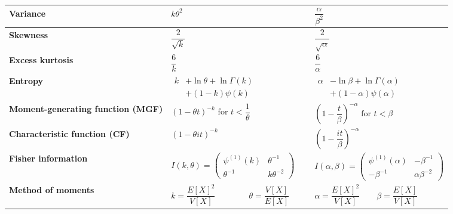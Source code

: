 \begin{longtable}{|m{3cm}|p{5.5cm}|p{5.5cm}|}
    \textbf{Variance} &
    ${\displaystyle k\theta ^{2}}$ &
    ${\displaystyle {\dfrac {\alpha }{\beta ^{2}}}}$
    \\[1ex] \hline

    \textbf{Skewness} &
    ${\displaystyle {\dfrac {2}{\sqrt {k}}}}$&
    ${\displaystyle {\dfrac {2}{\sqrt {\alpha }}}}$
    \\[1ex] \hline

    \textbf{Excess kurtosis} &
    ${\displaystyle {\dfrac {6}{k}}}$&
    ${\displaystyle {\dfrac {6}{\alpha }}}$
    \\[1ex] \hline

    \textbf{Entropy} &
    ${\displaystyle {\begin{aligned}k&+\ln \theta +\ln \Gamma (k)\\&+(1-k)\psi (k)\end{aligned}}}$&
    ${\displaystyle {\begin{aligned}\alpha &-\ln \beta +\ln \Gamma (\alpha )\\&+(1-\alpha )\psi (\alpha )\end{aligned}}}$
    \\[1ex] \hline

    \textbf{Moment-generating function (MGF)} &
    ${\displaystyle (1-\theta t)^{-k}{\text{ for }}t<{\dfrac {1}{\theta }}}$&
    ${\displaystyle \left(1-{\dfrac {t}{\beta }}\right)^{-\alpha }{\text{ for }}t<\beta }$
    \\[1ex] \hline

    \textbf{Characteristic function (CF)} &
    ${\displaystyle (1-\theta it)^{-k}}$&
    ${\displaystyle \left(1-{\dfrac {it}{\beta }}\right)^{-\alpha }}$
    \\[1ex] \hline

    \textbf{Fisher information} &
    ${\displaystyle I(k,\theta )={\begin{pmatrix}\psi ^{(1)}(k)&\theta ^{-1}\\\theta ^{-1}&k\theta ^{-2}\end{pmatrix}}}$&
    ${\displaystyle I(\alpha ,\beta )={\begin{pmatrix}\psi ^{(1)}(\alpha )&-\beta ^{-1}\\-\beta ^{-1}&\alpha \beta ^{-2}\end{pmatrix}}}$
    \\[1ex] \hline

    \textbf{Method of moments} &
    $
        {\displaystyle k={\dfrac {E[X]^{2}}{V[X]}}\quad \quad }
        \quad\quad
        {\displaystyle \theta ={\dfrac {V[X]}{E[X]}}\quad \quad }
    $&
    $
        {\displaystyle \alpha ={\dfrac {E[X]^{2}}{V[X]}}}
        \quad\quad
        {\displaystyle \beta ={\dfrac {E[X]}{V[X]}}}
    $
    \\[1ex] \hline

\end{longtable}
\renewcommand{\arraystretch}{1}


